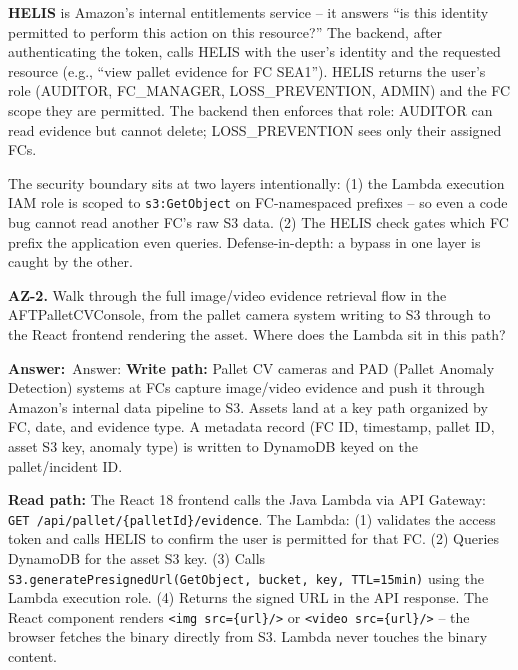\documentclass[letterpaper,10pt]{article}
\newlength{\boxwidth}
\newcommand{\answerlabel}{\noindent\textbf{\textcolor{answerblue}{Answer:}}~}
\begin{document}
\textbf{HELIS} is Amazon's internal entitlements service -- it answers ``is this identity permitted to perform this action on this resource?'' The backend, after authenticating the token, calls HELIS with the user's identity and the requested resource (e.g., ``view pallet evidence for FC SEA1''). HELIS returns the user's role (AUDITOR, FC\_MANAGER, LOSS\_PREVENTION, ADMIN) and the FC scope they are permitted. The backend then enforces that role: AUDITOR can read evidence but cannot delete; LOSS\_PREVENTION sees only their assigned FCs.

The security boundary sits at two layers intentionally: (1) the Lambda execution IAM role is scoped to \texttt{s3:GetObject} on FC-namespaced prefixes -- so even a code bug cannot read another FC's raw S3 data. (2) The HELIS check gates which FC prefix the application even queries. Defense-in-depth: a bypass in one layer is caught by the other.

\vspace{6pt}

\colorbox{qbg}{\begin{minipage}{\boxwidth}
\textbf{AZ-2.} Walk through the full image/video evidence retrieval flow in the AFTPalletCVConsole, from the pallet camera system writing to S3 through to the React frontend rendering the asset. Where does the Lambda sit in this path?
\end{minipage}}

\vspace{2pt}
\answerlabel{Answer:} \textbf{Write path:} Pallet CV cameras and PAD (Pallet Anomaly Detection) systems at FCs capture image/video evidence and push it through Amazon's internal data pipeline to S3. Assets land at a key path organized by FC, date, and evidence type. A metadata record (FC ID, timestamp, pallet ID, asset S3 key, anomaly type) is written to DynamoDB keyed on the pallet/incident ID.

\textbf{Read path:} The React 18 frontend calls the Java Lambda via API Gateway: \texttt{GET /api/pallet/\{palletId\}/evidence}. The Lambda: (1) validates the access token and calls HELIS to confirm the user is permitted for that FC. (2) Queries DynamoDB for the asset S3 key. (3) Calls \texttt{S3.generatePresignedUrl(GetObject, bucket, key, TTL=15min)} using the Lambda execution role. (4) Returns the signed URL in the API response. The React component renders \texttt{<img src=\{url\}/>} or \texttt{<video src=\{url\}/>} -- the browser fetches the binary directly from S3. Lambda never touches the binary content.
\end{document}
